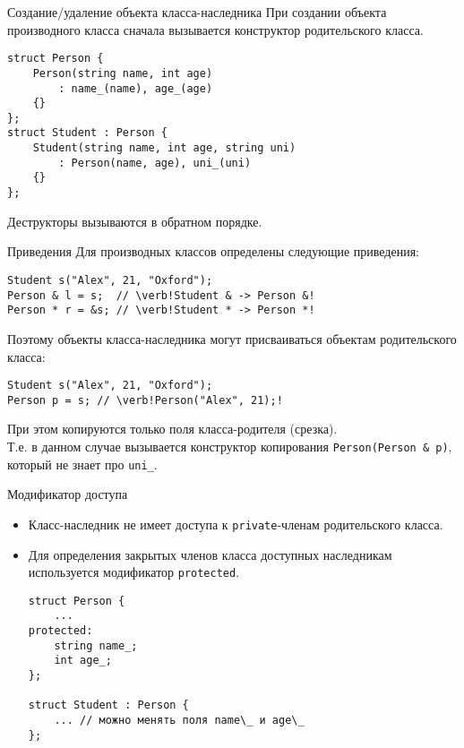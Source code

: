 \documentclass{beamer}
\begin{document}
\begin{frame}[fragile]{Создание/удаление объекта класса-наследника}
    При создании объекта производного класса сначала вызывается конструктор
    родительского класса.
\begin{lstlisting}
struct Person {
    Person(string name, int age)
        : name_(name), age_(age)
    {}
};
struct Student : Person {
    Student(string name, int age, string uni)
        : Person(name, age), uni_(uni)
    {}
};
\end{lstlisting}
    Деструкторы вызываются в обратном порядке.
\end{frame}

\begin{frame}[fragile]{Приведения}
    Для производных классов определены следующие приведения:
\begin{lstlisting}
Student s("Alex", 21, "Oxford");
Person & l = s;  // \verb!Student & -> Person &!
Person * r = &s; // \verb!Student * -> Person *!
\end{lstlisting}
    Поэтому объекты класса-наследника могут присваиваться
    объектам родительского класса:
\begin{lstlisting}
Student s("Alex", 21, "Oxford");
Person p = s; // \verb!Person("Alex", 21);!
\end{lstlisting}
    При этом копируются только поля класса-родителя (срезка).\\
    Т.е. в данном случае вызывается конструктор копирования
    {\tt Person(Person \& p)}, который не знает про {\tt uni\_}.
\end{frame}

\begin{frame}[fragile]{Модификатор доступа }
\begin{itemize}
    \item Класс-наследник не имеет доступа к {\tt private}-членам 
        родительского класса.
        
    \item Для определения закрытых членов класса доступных наследникам
        используется модификатор {\tt protected}.
\begin{lstlisting}
struct Person {
    ...
protected:
    string name_;
    int age_;    
};

struct Student : Person {
    ... // можно менять поля name\_ и age\_
};
\end{lstlisting}
\end{itemize}
\end{frame}
\end{document}
